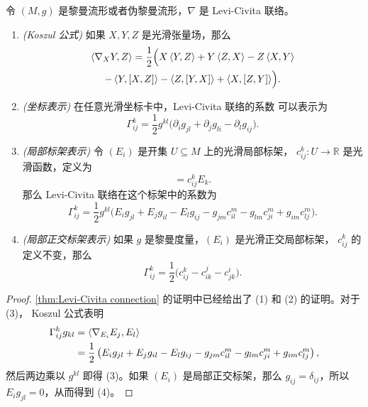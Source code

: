 \begin{corollary}
  令 $(M,g)$ 是黎曼流形或者伪黎曼流形，$\nabla$ 是 Levi-Civita 联络。
  \begin{enumerate}
    \item \emph{(Koszul 公式)} 如果 $X,Y,Z$ 是光滑张量场，那么
    \begin{multline}
      \left\langle \nabla_XY,Z\right\rangle=\frac{1}{2}\Bigl(X\left\langle Y,Z\right\rangle+Y\left\langle Z,X\right\rangle-Z\left\langle X,Y\right\rangle\\
      -\left\langle Y,[X,Z]\right\rangle-\left\langle Z,[Y,X]\right\rangle+
      \left\langle X,[Z,Y]\right\rangle\Bigr).
    \end{multline}
    \item \emph{(坐标表示)} 在任意光滑坐标卡中，Levi-Civita 联络的系数
    可以表示为
    \begin{equation}\label{eq:Levi-Civita connection in coordinates}
      \Gamma_{ij}^k=\frac{1}{2}g^{kl}\bigl(\partial_i g_{jl}+\partial_j g_{li}-\partial_l g_{ij}\bigr).
    \end{equation}
    \item \emph{(局部标架表示)} 令 $(E_i)$ 是开集 $U\subseteq M$ 上的光滑局部标架，
    $c_{ij}^k:U\to \mathbb{R}$ 是光滑函数，定义为
    \begin{equation}
      [E_i,E_j]=c_{ij}^kE_k.
    \end{equation}
    那么 Levi-Civita 联络在这个标架中的系数为
    \begin{equation}
      \Gamma_{ij}^k=\frac{1}{2}g^{kl}\bigl(E_ig_{jl}+E_jg_{il}-E_lg_{ij}-g_{jm}c_{il}^m-g_{lm}c_{ji}^m+g_{im}c_{lj}^m\bigr).
    \end{equation}
    \item \emph{(局部正交标架表示)} 如果 $g$ 是黎曼度量，$(E_i)$ 是光滑正交局部标架，
    $c_{ij}^k$ 的定义不变，那么
    \begin{equation}
      \Gamma_{ij}^k=\frac{1}{2}\bigl(c_{ij}^k-c_{ik}^j-c_{jk}^i\bigr).
    \end{equation}
  \end{enumerate}
\end{corollary}
\begin{proof}
  \autoref{thm:Levi-Civita connection} 的证明中已经给出了 (1) 和 (2) 的证明。对于 (3)，
  Koszul 公式表明
  \begin{align*}
    \Gamma_{ij}^kg_{kl}&=\left\langle \nabla_{E_i}E_j,E_l\right\rangle\\
    &=\frac{1}{2}\left(
      E_ig_{jl}+E_jg_{il}-E_lg_{ij}-g_{jm}c_{il}^m-g_{lm}c_{ji}^m+g_{im}c_{lj}^m
    \right),
  \end{align*}
  然后两边乘以 $g^{kl}$ 即得 (3)。如果 $(E_i)$ 是局部正交标架，那么
  $g_{ij}=\delta_{ij}$，所以 $E_i g_{jl}=0$，从而得到 (4)。
\end{proof}

